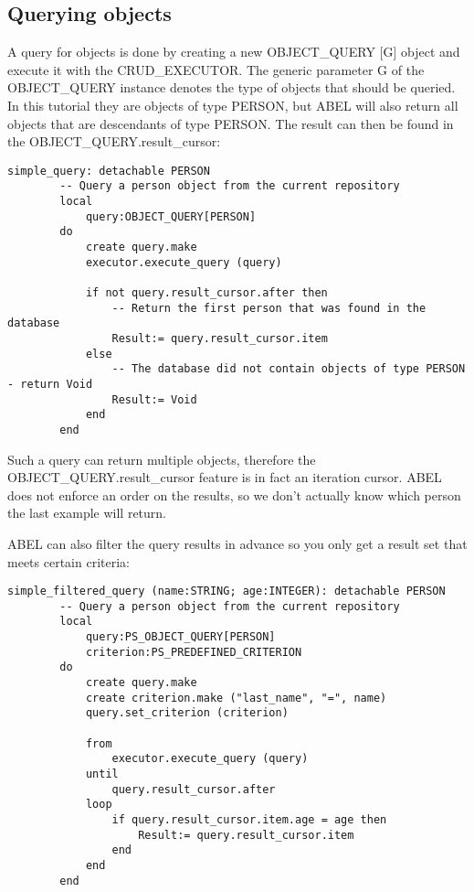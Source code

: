 \subsection{Querying objects}

A query for objects is done by creating a new OBJECT\_QUERY [G] object and execute it with the CRUD\_EXECUTOR.
The generic parameter G of the OBJECT\_QUERY instance denotes the type of objects that should be queried.
In this tutorial they are objects of type PERSON, but ABEL will also return all objects that are descendants of type PERSON.
The result can then be found in the OBJECT\_QUERY.result\_cursor:

\begin{lstlisting}[language=OOSC2Eiffel, captionpos=b, caption={}, label={lst:simple_query}]
	simple_query: detachable PERSON
		-- Query a person object from the current repository
		local
			query:OBJECT_QUERY[PERSON]
		do
			create query.make
			executor.execute_query (query)

			if not query.result_cursor.after then
				-- Return the first person that was found in the database
				Result:= query.result_cursor.item
			else
				-- The database did not contain objects of type PERSON - return Void
				Result:= Void
			end
		end
\end{lstlisting}

Such a query can return multiple objects, therefore the OBJECT\_QUERY.result\_cursor feature is in fact an iteration cursor.
ABEL does not enforce an order on the results, so we don't actually know which person the last example will return.

ABEL can also filter the query results in advance so you only get a result set that meets certain criteria: 

\begin{lstlisting}[language=OOSC2Eiffel, captionpos=b, caption={}, label={lst:simple_filtered_query}]
	simple_filtered_query (name:STRING; age:INTEGER): detachable PERSON
		-- Query a person object from the current repository
		local
			query:PS_OBJECT_QUERY[PERSON]
			criterion:PS_PREDEFINED_CRITERION
		do
			create query.make
			create criterion.make ("last_name", "=", name)
			query.set_criterion (criterion)

			from
				executor.execute_query (query)
			until 
				query.result_cursor.after
			loop
				if query.result_cursor.item.age = age then 
					Result:= query.result_cursor.item
				end
			end
		end
\end{lstlisting}

